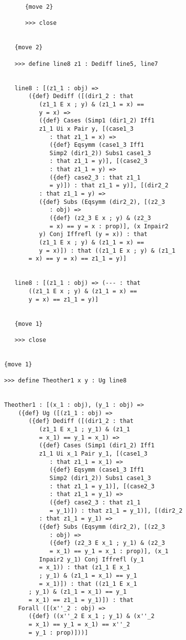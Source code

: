 \documentclass[12pt]{article}
\begin{document}
\begin{verbatim}
         {move 2}

         >>> close


      {move 2}

      >>> define line8 z1 : Dediff line5, line7


      line8 : [(z1_1 : obj) => 
          ({def} Dediff ([(dir1_2 : that 
             (z1_1 E x ; y) & (z1_1 = x) == 
             y = x) => 
             ({def} Cases (Simp1 (dir1_2) Iff1 
             z1_1 Ui x Pair y, [(case1_3 
                : that z1_1 = x) => 
                ({def} Eqsymm (case1_3 Iff1 
                Simp2 (dir1_2)) Subs1 case1_3 
                : that z1_1 = y)], [(case2_3 
                : that z1_1 = y) => 
                ({def} case2_3 : that z1_1 
                = y)]) : that z1_1 = y)], [(dir2_2 
             : that z1_1 = y) => 
             ({def} Subs (Eqsymm (dir2_2), [(z2_3 
                : obj) => 
                ({def} (z2_3 E x ; y) & (z2_3 
                = x) == y = x : prop)], (x Inpair2 
             y) Conj Iffrefl (y = x)) : that 
             (z1_1 E x ; y) & (z1_1 = x) == 
             y = x)]) : that ((z1_1 E x ; y) & (z1_1 
          = x) == y = x) == z1_1 = y)]


      line8 : [(z1_1 : obj) => (--- : that 
          ((z1_1 E x ; y) & (z1_1 = x) == 
          y = x) == z1_1 = y)]


      {move 1}

      >>> close


   {move 1}

   >>> define Theother1 x y : Ug line8


   Theother1 : [(x_1 : obj), (y_1 : obj) => 
       ({def} Ug ([(z1_1 : obj) => 
          ({def} Dediff ([(dir1_2 : that 
             (z1_1 E x_1 ; y_1) & (z1_1 
             = x_1) == y_1 = x_1) => 
             ({def} Cases (Simp1 (dir1_2) Iff1 
             z1_1 Ui x_1 Pair y_1, [(case1_3 
                : that z1_1 = x_1) => 
                ({def} Eqsymm (case1_3 Iff1 
                Simp2 (dir1_2)) Subs1 case1_3 
                : that z1_1 = y_1)], [(case2_3 
                : that z1_1 = y_1) => 
                ({def} case2_3 : that z1_1 
                = y_1)]) : that z1_1 = y_1)], [(dir2_2 
             : that z1_1 = y_1) => 
             ({def} Subs (Eqsymm (dir2_2), [(z2_3 
                : obj) => 
                ({def} (z2_3 E x_1 ; y_1) & (z2_3 
                = x_1) == y_1 = x_1 : prop)], (x_1 
             Inpair2 y_1) Conj Iffrefl (y_1 
             = x_1)) : that (z1_1 E x_1 
             ; y_1) & (z1_1 = x_1) == y_1 
             = x_1)]) : that ((z1_1 E x_1 
          ; y_1) & (z1_1 = x_1) == y_1 
          = x_1) == z1_1 = y_1)]) : that 
       Forall ([(x''_2 : obj) => 
          ({def} ((x''_2 E x_1 ; y_1) & (x''_2 
          = x_1) == y_1 = x_1) == x''_2 
          = y_1 : prop)]))]



\end{verbatim}
\end{document}
